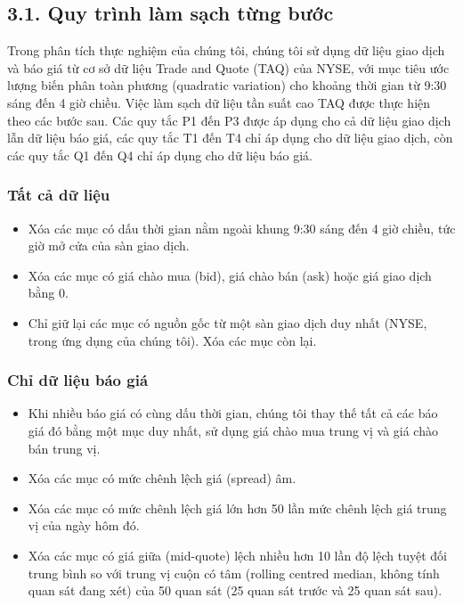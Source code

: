 \subsection*{3.1. Quy trình làm sạch từng bước}

Trong phân tích thực nghiệm của chúng tôi, chúng tôi sử dụng dữ liệu giao dịch và báo giá từ cơ sở dữ liệu Trade and Quote (TAQ) của NYSE, với mục tiêu ước lượng biến phân toàn phương (quadratic variation) cho khoảng thời gian từ 9:30 sáng đến 4 giờ chiều. Việc làm sạch dữ liệu tần suất cao TAQ được thực hiện theo các bước sau. Các quy tắc P1 đến P3 được áp dụng cho cả dữ liệu giao dịch lẫn dữ liệu báo giá, các quy tắc T1 đến T4 chỉ áp dụng cho dữ liệu giao dịch, còn các quy tắc Q1 đến Q4 chỉ áp dụng cho dữ liệu báo giá.

\subsubsection*{Tất cả dữ liệu}

\begin{itemize}
  \item[\textbf{P1.}] Xóa các mục có dấu thời gian nằm ngoài khung 9:30 sáng đến 4 giờ chiều, tức giờ mở cửa của sàn giao dịch.
  \item[\textbf{P2.}] Xóa các mục có giá chào mua (bid), giá chào bán (ask) hoặc giá giao dịch bằng 0.
  \item[\textbf{P3.}] Chỉ giữ lại các mục có nguồn gốc từ một sàn giao dịch duy nhất (NYSE, trong ứng dụng của chúng tôi). Xóa các mục còn lại.
\end{itemize}

\subsubsection*{Chỉ dữ liệu báo giá}

\begin{itemize}
  \item[\textbf{Q1.}] Khi nhiều báo giá có cùng dấu thời gian, chúng tôi thay thế tất cả các báo giá đó bằng một mục duy nhất, sử dụng giá chào mua trung vị và giá chào bán trung vị.
  \item[\textbf{Q2.}] Xóa các mục có mức chênh lệch giá (spread) âm.
  \item[\textbf{Q3.}] Xóa các mục có mức chênh lệch giá lớn hơn 50 lần mức chênh lệch giá trung vị của ngày hôm đó.
  \item[\textbf{Q4.}] Xóa các mục có giá giữa (mid-quote) lệch nhiều hơn 10 lần độ lệch tuyệt đối trung bình so với trung vị cuộn có tâm (rolling centred median, không tính quan sát đang xét) của 50 quan sát (25 quan sát trước và 25 quan sát sau).
\end{itemize}

